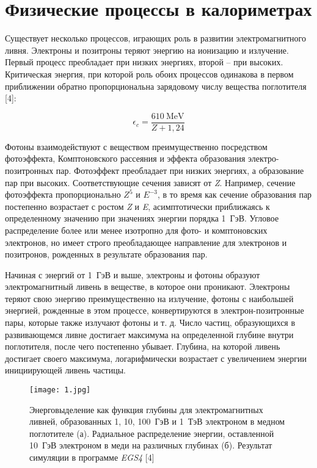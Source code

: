 \newpage
\section{Физические процессы в калориметрах}  \label{chap1}
 
 Существует несколько процессов, играющих роль в развитии электромагнитного ливня. Электроны и позитроны теряют энергию на ионизацию и излучение. Первый процесс преобладает при низких энергиях, второй – при высоких. Критическая энергия, при которой роль обоих процессов одинакова в первом приближении обратно пропорциональна зарядовому числу вещества поглотителя [4]:
 
\begin{equation}\label{eq:kriten}
\epsilon_c = \frac{610\ \mathrm{MeV}}{Z+1,24}
\end{equation}
 
Фотоны взаимодействуют с веществом преимущественно посредством фотоэффекта, Комптоновского рассеяния и эффекта образования электро-позитронных пар. Фотоэффект преобладает при низких энергиях, а образование пар при высоких. Соответствующие сечения зависят от {\textit Z}. Например, сечение фотоэффекта пропорционально $Z^{5}$ и $E^{-3}$, в то время как сечение образования пар постепенно возрастает с ростом {\textit Z} и {\textit E}, асимптотически приближаясь к определенному значению при значениях энергии порядка \mbox{1 ГэВ}. Угловое распределение более или менее изотропно для фото- и комптоновских электронов, но имеет строго преобладающее направление для электронов и позитронов, рожденных в результате образования пар.

Начиная с энергий от \mbox{1 ГэВ} и выше, электроны и фотоны образуют электромагнитный ливень в веществе, в которое они проникают. Электроны теряют свою энергию преимущественно на излучение, фотоны с наибольшей энергией, рожденные в этом процессе, конвертируются в электрон-позитронные пары, которые также излучают фотоны и т. д.  Число частиц, образующихся в развивающемся ливне достигает максимума на определенной глубине внутри поглотителя, после чего постепенно убывает. Глубина, на которой ливень достигает своего максимума, логарифмически возрастает с увеличением энергии инициирующей ливень частицы.

\begin{figure}[H]
    \centering
    \texttt{[image: 1.jpg]}
    \caption{Энерговыделение как функция глубины для электромагнитных ливней, образованных 1, 10, \mbox{100 ГэВ} и \mbox{1 ТэВ} электроном в медном поглотителе (а). Радиальное распределение энергии, оставленной \mbox{10 ГэВ} электроном в меди на различных глубинах (б). Результат симуляции в программе \textit{EGS4} [4]}
    \label{fig:enDep}
\end{figure}

